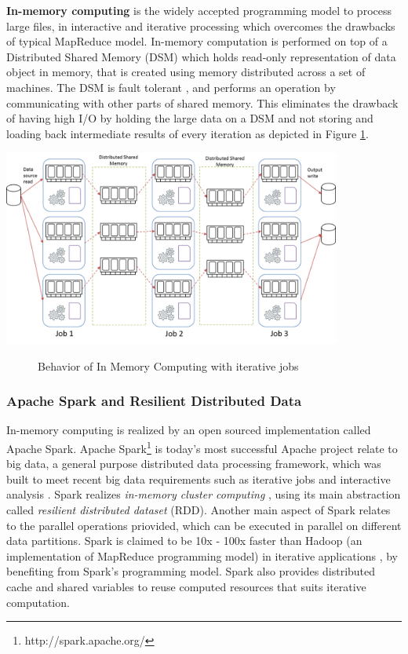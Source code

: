 
\textbf{In-memory computing} is the widely accepted programming model to process large files, in interactive and iterative processing which overcomes the drawbacks of typical MapReduce model. In-memory computation is performed on top of a Distributed Shared Memory (DSM) which holds read-only representation of data object in memory, that is created using memory distributed across a set of machines. The DSM is fault tolerant \cite{RDD}, and performs an operation by communicating with other parts of shared memory. This eliminates the drawback of having high I/O by holding the large data on a DSM and not storing and loading back intermediate results of every iteration as depicted in Figure \ref{fig:in-memory-computing}.
 \begin{center}
	\includegraphics[width=30em]{./Figures/in-memory-computing}
	\begin{figure}[htbp]
    \caption{Behavior of In Memory Computing with iterative jobs}
    \label{fig:in-memory-computing}
	\end{figure}
\end{center} 
\subsubsection{Apache Spark and Resilient Distributed Data }
\label{sec:spark}
In-memory computing is realized by an open sourced implementation called Apache Spark. Apache Spark\footnote{http://spark.apache.org/} is today's most successful Apache project relate to big data, a general purpose distributed data processing framework, which was built to meet recent big data requirements such as iterative jobs and interactive analysis \cite{Spark}. Spark realizes \textit{in-memory cluster computing} \cite{RDD}, using its main abstraction called \textit{resilient distributed dataset} (RDD). Another main aspect of Spark relates to the parallel operations priovided, which can be executed in parallel on different data partitions. Spark is claimed to be 10x - 100x faster than Hadoop (an implementation of MapReduce programming model) in iterative applications \cite{Spark, RDD, clashoftitians,Spark-improvements}, by benefiting from Spark's programming model. Spark also provides distributed cache and shared variables to reuse computed resources that suits iterative computation. 

